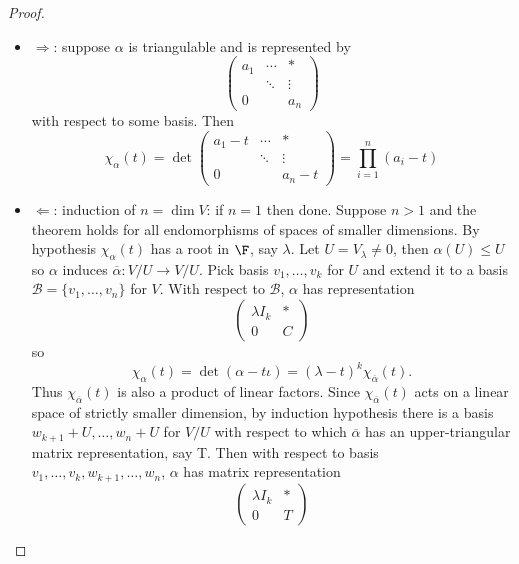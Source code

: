 \documentclass[a4paper]{article}
\newcommand*{\basis}{\mathcal}
\theoremstyle{definition}
\begin{document}
\begin{proof}\leavevmode
  \begin{itemize}
  \item \(\Rightarrow\): suppose \(\alpha\) is triangulable and is represented by
    \[
      \begin{pmatrix}
        a_1 & \cdots & * \\
        & \ddots & \vdots \\
        0 & & a_n
      \end{pmatrix}
    \]
    with respect to some basis. Then
    \[
      \chi_\alpha(t) = \det
      \begin{pmatrix}
        a_1 - t & \cdots & * \\
        & \ddots & \vdots \\
        0 & & a_n -t
      \end{pmatrix}
      = \prod_{i = 1}^{n} (a_i - t)
    \]
  \item \(\Leftarrow\): induction of \(n = \dim V\): if \(n = 1\) then done. Suppose \(n > 1\) and the theorem holds for all endomorphisms of spaces of smaller dimensions. By hypothesis \(\chi_\alpha(t)\) has a root in \(\F\), say \(\lambda\). Let \(U = V_\lambda \neq 0\), then \(\alpha(U) \leq U\) so \(\alpha\) induces \(\overline \alpha: V/U \to V/U\). Pick basis \(v_1, \dots, v_k\) for \(U\) and extend it to a basis \(\basis B = \{v_1, \dots, v_n\}\) for \(V\). With respect to \(\basis B\), \(\alpha\) has representation
    \[
      \begin{pmatrix}
        \lambda I_k & * \\
        0 & C
      \end{pmatrix}
    \]
    so
    \[
      \chi_\alpha(t) = \det(\alpha - t \iota) = (\lambda - t)^k \chi_{\overline \alpha}(t).
    \]
    Thus \(\chi_{\overline \alpha}(t)\) is also a product of linear factors. Since \(\chi_{\overline \alpha}(t)\) acts on a linear space of strictly smaller dimension, by induction hypothesis there is a basis \(w_{k + 1} + U, \dots, w_n + U\) for \(V/U\) with respect to which \(\overline \alpha\) has an upper-triangular matrix representation, say T. Then with respect to basis \(v_1, \dots, v_k, w_{k + 1}, \dots, w_n\), \(\alpha\) has matrix representation
    \[
      \begin{pmatrix}
        \lambda I_k & * \\
        0 & T
      \end{pmatrix}
    \]
  \end{itemize}
\end{proof}
\end{document}
